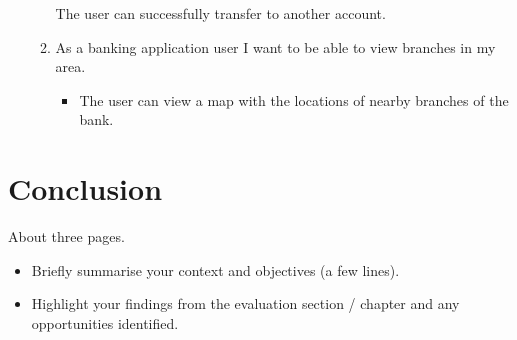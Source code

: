 \begin{itemize}
\begin{enumerate}
\begin{center}
\end{center}
        The user can successfully transfer to another account.
        \item As a banking application user I want to be able to view branches in my area.
            \begin{itemize}
                \item The user can view a map with the locations of nearby branches of the bank.
            \end{itemize}
        \end{enumerate}
    \end{itemize}

\chapter{Conclusion}
About three pages.

\begin{itemize}
\item Briefly summarise your context and objectives (a few lines).
\item Highlight your findings from the evaluation section / chapter and any opportunities identified.
\end{itemize}
